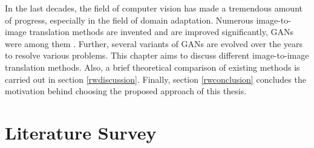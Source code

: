 
\justifying
\setlength{\parskip}{1em}

In the last decades, the field of computer vision has made a tremendous amount of progress, especially in the field of domain adaptation. Numerous image-to-image translation methods are invented and are improved significantly, \acp{GAN} were among them \cite{pang2021imagetoimage}. Further, several variants of \acp{GAN} are evolved over the years to resolve various problems. This chapter aims to discuss different image-to-image translation methods. Also, a brief theoretical comparison of existing methods is carried out in section \ref{rwdiscussion}. Finally, section \ref{rwconclusion} concludes the motivation behind choosing the proposed approach of this thesis.

\section{Literature Survey}\label{LiteratureSurvey}


